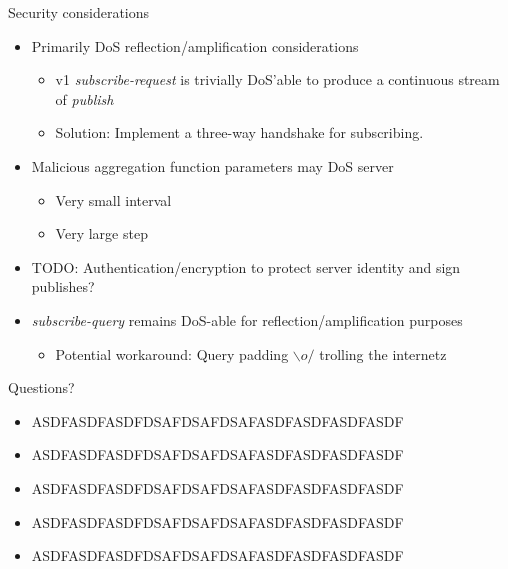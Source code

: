 \documentclass{beamer}
\begin{document}
\begin{frame}{Security considerations}
\begin{itemize}
	\item Primarily DoS reflection/amplification considerations
	\begin{itemize}
  		\item v1 \emph{subscribe-request} is trivially DoS'able to produce a continuous stream of \emph{publish}
  		\item Solution: Implement a three-way handshake for subscribing.
	\end{itemize}
  	\item Malicious aggregation function parameters may DoS server
  	\begin{itemize}
  		\item Very small interval
  		\item Very large step
  	\end{itemize}
  	\item TODO: Authentication/encryption to protect server identity and sign publishes?
  	\item \emph{subscribe-query} remains DoS-able for reflection/amplification purposes
  	\begin{itemize}
  		\item Potential workaround: Query padding $\backslash o /$ {\tiny trolling the internetz}
  	\end{itemize}
\end{itemize}
\end{frame}

\begin{frame}{Questions?}
\begin{itemize}
\item ASDFASDFASDFDSAFDSAFDSAFASDFASDFASDFASDF
\item ASDFASDFASDFDSAFDSAFDSAFASDFASDFASDFASDF
\item ASDFASDFASDFDSAFDSAFDSAFASDFASDFASDFASDF
\item ASDFASDFASDFDSAFDSAFDSAFASDFASDFASDFASDF
\item ASDFASDFASDFDSAFDSAFDSAFASDFASDFASDFASDF
\end{itemize}
\end{frame}
\end{document}
